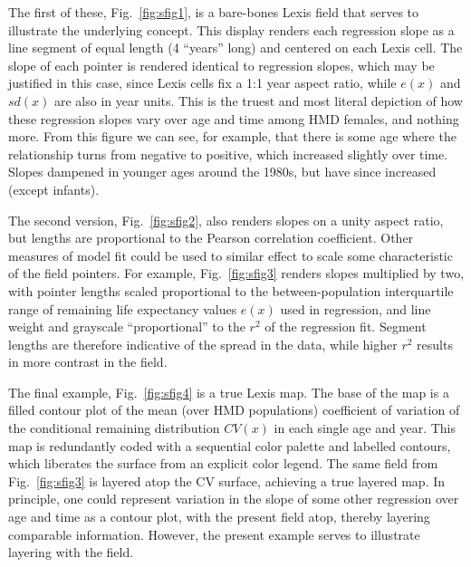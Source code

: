 \documentclass{article}
\begin{document}
The first of these, Fig.~\ref{fig:sfig1}, is a bare-bones Lexis field that serves to illustrate the underlying concept. This display renders each regression slope as a line segment of equal length (4 ``years'' long) and centered on each Lexis cell. The slope of each pointer is rendered identical to regression slopes, which may be justified in this case, since Lexis cells fix a 1:1 year aspect ratio, while $e(x)$ and $sd(x)$ are also in year units. This is the truest and most literal depiction of how these regression slopes vary over age and time among HMD females, and nothing more. From this figure we can see, for example, that there is some age where the relationship turns from negative to positive, which increased slightly over time. Slopes dampened in younger ages around the 1980s, but have since increased (except infants).

The second version, Fig.~\ref{fig:sfig2}, also renders slopes on a unity aspect ratio, but lengths are proportional to the Pearson correlation coefficient. Other measures of model fit could be used to similar effect to scale some characteristic of the field pointers. For example, Fig.~\ref{fig:sfig3} renders slopes multiplied by two, with pointer lengths scaled proportional to the between-population interquartile range of remaining life expectancy values $e(x)$ used in regression, and line weight and grayscale ``proportional'' to the $r^2$ of the regression fit. Segment lengths are therefore indicative of the spread in the data, while higher $r^2$ results in more contrast in the field. 

The final example, Fig.~\ref{fig:sfig4} is a true Lexis map. The base of the map is a filled contour plot of the mean (over HMD populations) coefficient of variation of the conditional remaining distribution $CV(x)$ in each single age and year. This map is redundantly coded with a sequential color palette and labelled contours, which liberates the surface from an explicit color legend. The same field from Fig.~\ref{fig:sfig3} is layered atop the CV surface, achieving a true layered map. In principle, one could represent variation in the slope of some other regression over age and time as a contour plot, with the present field atop, thereby layering comparable information. However, the present example serves to illustrate layering with the field.
\end{document}
